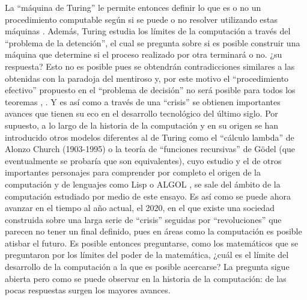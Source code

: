 \documentclass[a4paper,11pt]{article}
\begin{document}
La “máquina de Turing” le permite entonces definir lo que es o no un procedimiento computable según si se puede o no resolver utilizando estas máquinas \cite{hernández_2013}. Además, Turing estudia los límites de la computación a través del “problema de la detención”, el cual se pregunta sobre si es posible construir una máquina que determine si el proceso realizado por otra terminará o no. ¿su respuesta? Esto no es posible pues se obtendrán contradicciones similares a las obtenidas con la paradoja del mentiroso y, por este motivo el “procedimiento efectivo” propuesto en el “problema de decisión” no será posible para todos los teoremas \cite{chaitin2003ordenadores}, \cite{hernández_2013}.
Y es así como a través de una “crisis” se obtienen importantes avances que tienen su eco en el desarrollo tecnológico del último siglo. Por supuesto, a lo largo de la historia de la computación y en su origen se han introducido otros modelos diferentes al de Turing como el “cálculo lambda” de Alonzo Church (1903-1995) o la teoría de “funciones recursivas” de Gödel (que eventualmente se probaría que son equivalentes), cuyo estudio y el de otros importantes personajes para comprender por completo el origen de la computación y de lenguajes como Lisp o ALGOL \cite{hernández_2013}, \cite{baez2010physics} se sale del ámbito de la computación estudiado por medio de este ensayo.
Es así como se puede ahora avanzar en el tiempo al año actual, el 2020, en el que existe una sociedad construida sobre una larga serie de “crisis” seguidas por “revoluciones” que parecen no tener un final definido, pues en áreas como la computación es posible atisbar el futuro. Es posible entonces preguntarse, como los matemáticos que se preguntaron por los límites del poder de la matemática, ¿cuál es el límite del desarrollo de la computación a la que es posible acercarse? La pregunta sigue abierta pero como se puede observar en la historia de la computación: de las pocas respuestas surgen los mayores avances.  

\nocite{maestre_timón_2018}



\newpage

\renewcommand\refname{REFERENCIAS BIBLIOGRÁFICAS}
%


\end{document}
